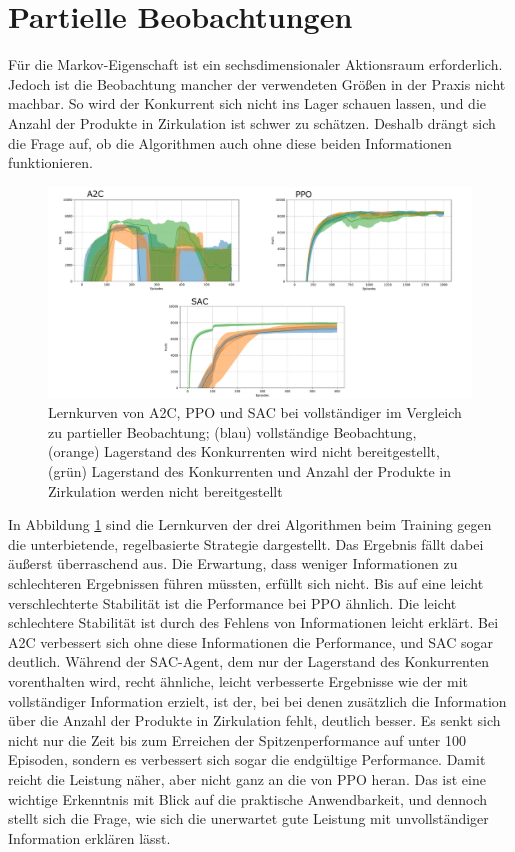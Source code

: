 \section{Partielle Beobachtungen}
Für die Markov-Eigenschaft ist ein sechsdimensionaler Aktionsraum erforderlich.
Jedoch ist die Beobachtung mancher der verwendeten Größen in der Praxis nicht machbar.
So wird der Konkurrent sich nicht ins Lager schauen lassen, und die Anzahl der Produkte in Zirkulation ist schwer zu schätzen.
Deshalb drängt sich die Frage auf, ob die Algorithmen auch ohne diese beiden Informationen funktionieren.

\begin{figure}[htbp]
	\centering
	\includegraphics[width=\textwidth]{main/partial_observation.pdf}
	\caption{Lernkurven von A2C, PPO und SAC bei vollständiger im Vergleich zu partieller Beobachtung; (blau) vollständige Beobachtung, (orange) Lagerstand des Konkurrenten wird nicht bereitgestellt, (grün) Lagerstand des Konkurrenten und Anzahl der Produkte in Zirkulation werden nicht bereitgestellt}
	\label{grafic:PartialObservation}
\end{figure}

In Abbildung \ref{grafic:PartialObservation} sind die Lernkurven der drei Algorithmen beim Training gegen die unterbietende, regelbasierte Strategie dargestellt.
Das Ergebnis fällt dabei äußerst überraschend aus.
Die Erwartung, dass weniger Informationen zu schlechteren Ergebnissen führen müssten, erfüllt sich nicht.
Bis auf eine leicht verschlechterte Stabilität ist die Performance bei PPO ähnlich.
Die leicht schlechtere Stabilität ist durch des Fehlens von Informationen leicht erklärt.
Bei A2C verbessert sich ohne diese Informationen die Performance, und SAC sogar deutlich.
Während der SAC-Agent, dem nur der Lagerstand des Konkurrenten vorenthalten wird, recht ähnliche, leicht verbesserte Ergebnisse wie der mit vollständiger Information erzielt, ist der, bei bei denen zusätzlich die Information über die Anzahl der Produkte in Zirkulation fehlt, deutlich besser.
Es senkt sich nicht nur die Zeit bis zum Erreichen der Spitzenperformance auf unter 100 Episoden, sondern es verbessert sich sogar die endgültige Performance.
Damit reicht die Leistung näher, aber nicht ganz an die von PPO heran.
Das ist eine wichtige Erkenntnis mit Blick auf die praktische Anwendbarkeit, und dennoch stellt sich die Frage, wie sich die unerwartet gute Leistung mit unvollständiger Information erklären lässt.


